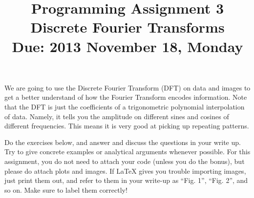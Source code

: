 \documentclass[11pt]{amsart}
\theoremstyle{plain}
\theoremstyle{definition}
\theoremstyle{remark}
\numberwithin{equation}{section} %
\numberwithin{figure}{section}   %
\newcounter{my_counter}
\begin{document}
\title{Programming Assignment 3
\\Discrete Fourier Transforms
\\\vspace{0.2cm}\scriptsize{Due: 2013 November 18, Monday}
}
\maketitle
\thispagestyle{empty}
We are going to use the Discrete Fourier Transform (DFT) on data and images to get a better understand of how the Fourier Transform encodes information.  Note that the DFT is just the coefficients of a trigonometric polynomial interpolation of data.  Namely, it tells you the amplitude on different sines and cosines of different frequencies.  This means it is very good at picking up repeating patterns.   

Do the exercises below, and answer and discuss the questions in your write up.  Try to give concrete examples or analytical arguments whenever possible.  For this assignment, you do not need to attach your code (unless you do the bonus), but please do attach plots and images.  If LaTeX gives you trouble importing images, just print them out, and refer to them in your write-up as ``Fig. 1'', ``Fig. 2'', and so on.  Make sure to label them correctly!
\end{document}
